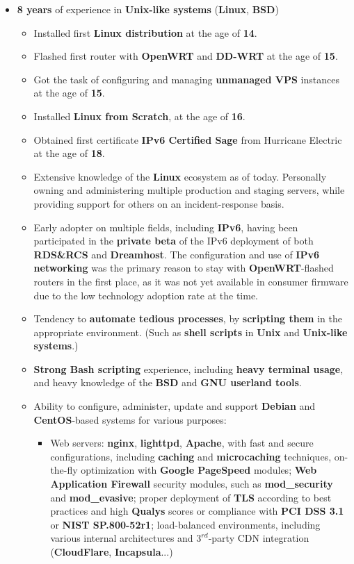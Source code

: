\documentclass[11pt,a4paper,sans]{moderncv}
\begin{document}
	\begin{itemize}
	\item	\label{devops}  \textbf{8 years} of experience in \textbf{Unix-like systems} (\textbf{Linux}, \textbf{BSD})
		\begin{itemize}
		\item	Installed first \textbf{Linux distribution} at the age of \textbf{14}.
		\item	Flashed first router with \textbf{OpenWRT} and \textbf{DD-WRT} at the age of \textbf{15}.
		\item	Got the task of configuring and managing \textbf{unmanaged VPS} instances at the age of \textbf{15}.
		\item	Installed \textbf{Linux from Scratch}, at the age of \textbf{16}.
		\item	Obtained first certificate \textbf{IPv6 Certified Sage} from Hurricane Electric at the age of \textbf{18}.
		\item	Extensive knowledge of the \textbf{Linux} ecosystem as of today. Personally owning and administering multiple production and staging servers, while providing support for others on an incident-response basis.
		\item	Early adopter on multiple fields, including \textbf{IPv6}, having been participated in the \textbf{private beta} of the IPv6 deployment of both \textbf{RDS\&RCS} and \textbf{Dreamhost}. The configuration and use of \textbf{IPv6 networking} was the primary reason to stay with \textbf{OpenWRT}-flashed routers in the first place, as it was not yet available in consumer firmware due to the low technology adoption rate at the time.
		\item	Tendency to \textbf{automate tedious processes}, by \textbf{scripting them} in the appropriate environment. (Such as \textbf{shell scripts} in \textbf{Unix} and \textbf{Unix-like systems}.)
		\item	\textbf{Strong Bash scripting} experience, including \textbf{heavy terminal usage}, and heavy knowledge of the \textbf{BSD} and \textbf{GNU userland tools}.
		\item	Ability to configure, administer, update and support \textbf{Debian} and \textbf{CentOS}-based systems for various purposes:
			\begin{itemize}
			\item	Web servers: \textbf{nginx}, \textbf{lighttpd}, \textbf{Apache}, with fast and secure configurations, including \textbf{caching} and \textbf{microcaching} techniques, on-the-fly optimization with \textbf{Google PageSpeed} modules; \textbf{Web Application Firewall} security modules, such as \textbf{mod\_security} and \textbf{mod\_evasive}; proper deployment of \textbf{TLS} according to best practices and high \textbf{Qualys} scores or compliance with \textbf{PCI DSS 3.1} or \textbf{NIST SP.800-52r1}; load-balanced environments, including various internal architectures and $3^{rd}$-party CDN integration (\textbf{CloudFlare}, \textbf{Incapsula}...)

\end{itemize}
\end{itemize}
\end{itemize}
\end{document}
